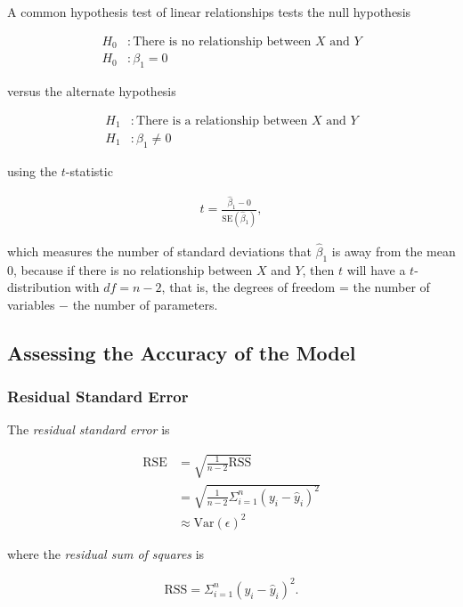 \documentclass[]{article}
\newcommand{\rss}{\mathrm{RSS}}
\newcommand{\rse}{\mathrm{RSE}}
\newcommand{\var}{\mathrm{Var}}
\newcommand{\se}{\mathrm{SE}}
\begin{document}
A common hypothesis test of linear relationships tests the null
hypothesis

\begin{align}
    H_0&: \text{There is no relationship between }X\text{ and }Y\nonumber \\
    H_0&: \beta_1 = 0
\end{align}

versus the alternate hypothesis

\begin{align}
    H_1&: \text{There is a relationship between }X\text{ and }Y\nonumber \\
    H_1&: \beta_1 \ne 0
\end{align}

using the \(t\)-statistic

\begin{align}
    t = \frac{\hat{\beta}_1 - 0}{\se\left(\hat{\beta}_1\right)},
\end{align}

which measures the number of standard deviations that \(\hat{\beta}_1\)
is away from the mean 0, because if there is no relationship between
\(X\) and \(Y\), then \(t\) will have a \(t\)-distribution with
\(df = n - 2\), that is, the degrees of freedom = the number of
variables \(-\) the number of parameters.

\subsection{Assessing the Accuracy of the
Model}\label{assessing-the-accuracy-of-the-model}

\subsubsection{Residual Standard Error}\label{residual-standard-error}

The \emph{residual standard error} is

\begin{align}
    \rse &= 
        \sqrt{\frac{1}{n-2}\rss}\nonumber \\
        &=\sqrt{\frac{1}{n-2}\Sigma_{i=1}^n\left(y_i - \hat{y}_i\right)^2} \\
        &\approx        \var(\epsilon)^2 \nonumber
\end{align}

where the \emph{residual sum of squares} is

\begin{align}
    \rss =\Sigma_{i=1}^n\left(y_i - \hat{y}_i\right)^2. 
\end{align}
\end{document}
